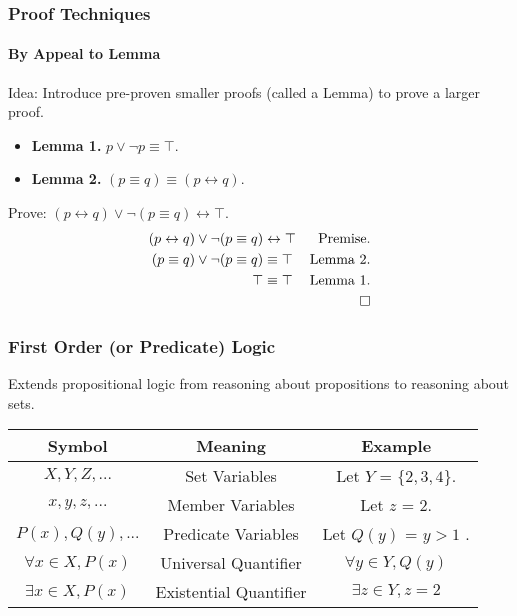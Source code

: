 \documentclass[usenames,dvipsnames]{beamer}
\begin{document}
\begin{frame}[fragile]
  \frametitle{Proof Techniques}
  \framesubtitle{By Appeal to Lemma}
  Idea: Introduce pre-proven smaller proofs (called a Lemma) to prove a larger
        proof. \\
  \begin{itemize}
    \item \textbf{Lemma 1.} $p \lor \lnot p \equiv \top$. \\
    \item \textbf{Lemma 2.} $(p \equiv q) \equiv (p \leftrightarrow q)$. 
  \end{itemize} 
  Prove: $(p \leftrightarrow q) \lor \lnot (p \equiv q) \leftrightarrow \top$.
  \begin{align*}
    (p \leftrightarrow q) \lor \lnot (p \equiv q) &\leftrightarrow \top
          &\text{Premise.} \\
    (p \equiv q) \lor \lnot (p \equiv q) &\equiv \top
          &\text{Lemma 2.} \\
    \top &\equiv \top &\text{Lemma 1.} \\
    & &\qed
  \end{align*}
\end{frame}

\begin{frame}[fragile]
  \frametitle{First Order (or Predicate) Logic}
  Extends propositional logic from reasoning about propositions to reasoning
  about sets. \\
  \begin{tabular}{| c | c | c |}
  \hline
  \textbf{Symbol} & \textbf{Meaning} & \textbf{Example} \\
  \hline
  $X, Y, Z, ...$ & Set Variables & Let $Y$ = $\{2, 3, 4\}$. \\
  $x, y, z, ...$ & Member Variables & Let $z$ = 2.\\
  $P(x), Q(y), ...$ & Predicate Variables & Let $Q(y)$ = $y > 1$ .\\
  $\forall x \in X, P(x)$ & Universal Quantifier & $\forall y \in Y, Q(y)$ \\
  $\exists x \in X, P(x)$ & Existential Quantifier & $\exists z \in Y, z = 2$\\
  \hline
  \end{tabular}
\end{frame}
\end{document}

